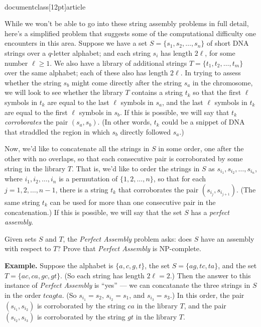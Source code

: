 \\documentclass[12pt]{article}
\begin{document}
\begin{enumerate}
While we won't be able to go into these string assembly
problems in full detail, here's a simplified
problem that suggests some of the computational difficulty
one encounters in this area.
Suppose we have a set $S = \{s_1, s_2, \ldots, s_n\}$
of short DNA strings over a $q$-letter alphabet;
and each string $s_i$ has length $2\ell$, for some number $\ell \geq 1$.
We also have a library of additional strings
$T = \{t_1, t_2, \ldots, t_m\}$
over the same alphabet;
each of these also has length $2 \ell$.
In trying to assess whether the string $s_b$
might come directly after the string $s_a$
in the chromosome, we will look to see whether
the library $T$ contains a string $t_k$ so that
the first $\ell$ symbols in $t_k$ are equal
to the last $\ell$ symbols in $s_a$,
and the last $\ell$ symbols in $t_k$ are equal
to the first $\ell$ symbols in $s_b$.
If this is possible, we will say that
$t_k$ {\em corroborates} the pair $(s_a, s_b)$.
(In other words, $t_k$ could be a snippet of DNA
that straddled the region in which $s_b$ directly followed $s_a$.)

Now, we'd like to concatenate all the strings in $S$
in some order, one after the other with no overlaps,
so that each consecutive pair is corroborated
by some string in the library $T$.
That is, we'd like to order the strings in $S$ as
$s_{i_1}, s_{i_2}, \ldots, s_{i_n}$,
where $i_1, i_2, \ldots, i_n$ is a permutation of $\{1, 2, \ldots, n\}$,
so that for each $j = 1, 2, \ldots, n-1$,
there is a string $t_k$ that corroborates the
pair $(s_{i_j}, s_{i_{j+1}})$.
(The same string $t_k$ can be used for more than
one consecutive pair in the concatenation.)
If this is possible, we will say that the set $S$
has a {\em perfect assembly}.

Given sets $S$ and $T$, the {\em Perfect Assembly} problem asks:
does $S$ have an assembly with respect to $T$?
Prove that {\em Perfect Assembly} is NP-complete.

\smallskip
{\bf Example.} Suppose the alphabet is $\{a, c, g, t\}$,
the set $S = \{ag, tc, ta\}$, and the set
$T = \{ac, ca, gc, gt\}$.
(So each string has length $2 \ell = 2$.)
Then the answer to this instance of {\em Perfect Assembly}
is ``yes'' ---
we can concatanate the three strings in $S$ in the order
$tcagta$.
(So $s_{i_1} = s_2$, $s_{i_2} = s_1$, and $s_{i_3} = s_3$.)
In this order, the pair $(s_{i_1},s_{i_2})$ is
corroborated by the string $ca$ in the library $T$,
and the pair $(s_{i_2}, s_{i_3})$ is corroborated
by the string $gt$ in the library $T$.




\end{enumerate}
\end{document}
